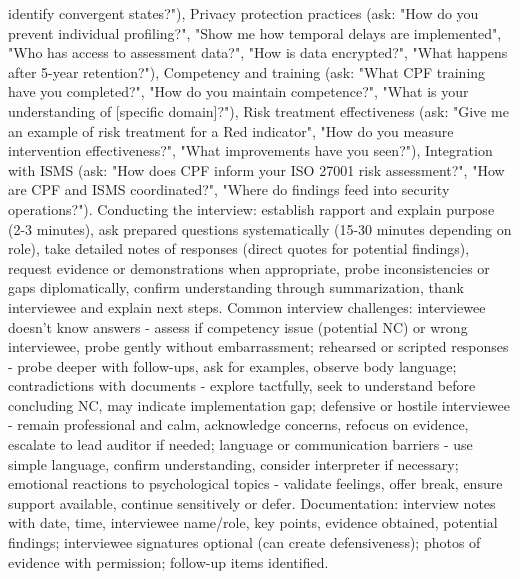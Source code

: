 \documentclass[11pt,a4paper]{article}
\begin{document}
identify convergent states?"), Privacy protection practices (ask: "How do you prevent individual profiling?", "Show me how temporal delays are implemented", "Who has access to assessment data?", "How is data encrypted?", "What happens after 5-year retention?"), Competency and training (ask: "What CPF training have you completed?", "How do you maintain competence?", "What is your understanding of [specific domain]?"), Risk treatment effectiveness (ask: "Give me an example of risk treatment for a Red indicator", "How do you measure intervention effectiveness?", "What improvements have you seen?"), Integration with ISMS (ask: "How does CPF inform your ISO 27001 risk assessment?", "How are CPF and ISMS coordinated?", "Where do findings feed into security operations?"). Conducting the interview: establish rapport and explain purpose (2-3 minutes), ask prepared questions systematically (15-30 minutes depending on role), take detailed notes of responses (direct quotes for potential findings), request evidence or demonstrations when appropriate, probe inconsistencies or gaps diplomatically, confirm understanding through summarization, thank interviewee and explain next steps. Common interview challenges: interviewee doesn't know answers - assess if competency issue (potential NC) or wrong interviewee, probe gently without embarrassment; rehearsed or scripted responses - probe deeper with follow-ups, ask for examples, observe body language; contradictions with documents - explore tactfully, seek to understand before concluding NC, may indicate implementation gap; defensive or hostile interviewee - remain professional and calm, acknowledge concerns, refocus on evidence, escalate to lead auditor if needed; language or communication barriers - use simple language, confirm understanding, consider interpreter if necessary; emotional reactions to psychological topics - validate feelings, offer break, ensure support available, continue sensitively or defer. Documentation: interview notes with date, time, interviewee name/role, key points, evidence obtained, potential findings; interviewee signatures optional (can create defensiveness); photos of evidence with permission; follow-up items identified.
\end{document}
